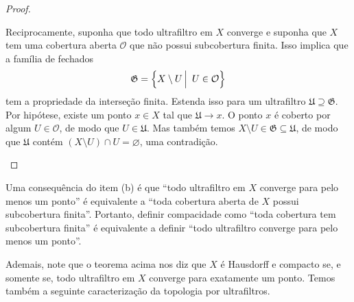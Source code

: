 \begin{proof}
\begin{enumerate}[(a)]
     Reciprocamente, suponha que todo ultrafiltro em 
     $X$
     converge e suponha que
     $X$
     tem uma cobertura aberta
     $\mathcal{O}$
     que não possui subcobertura finita.
     Isso implica que a família de fechados
     \begin{equation*}
         \mathfrak{G}
         =
         \setsuchthat{ X \setminus U }{ U \in \mathcal{O} }
     \end{equation*}
     tem a propriedade da interseção finita.
     Estenda isso para um ultrafiltro
     $\mathfrak{U} \supseteq \mathfrak{G}$.
     Por hipótese, existe um ponto
     $x \in X$
     tal que 
     $\mathfrak{U} \to x$.
     O ponto 
     $x$
     é coberto por algum
     $U \in \mathcal{O}$,
     de modo que
     $U \in \mathfrak{U}$.
     Mas também temos
     $X \setminus U \in \mathfrak{G} \subseteq \mathfrak{U}$,
     de modo que
     $\mathfrak{U}$
     contém
     $(X \setminus U) \cap U = \varnothing$,
     uma contradição.
 \end{enumerate}
 \end{proof}
 
 Uma consequência do item (b) é que ``todo ultrafiltro em 
 $X$ 
 converge para pelo menos um ponto'' é equivalente a
 ``toda cobertura aberta de 
 $X$ 
 possui subcobertura finita''. 
 Portanto, definir compacidade como
 ``toda cobertura tem subcobertura finita''
 é equivalente a definir 
 ``todo ultrafiltro converge para pelo menos um ponto''.
 
 Ademais, note que o teorema acima nos diz que 
 $X$
 é Hausdorff e compacto se, e somente se, todo ultrafiltro em
 $X$
 converge para exatamente um ponto.
 Temos também a seguinte caracterização da topologia por ultrafiltros.

